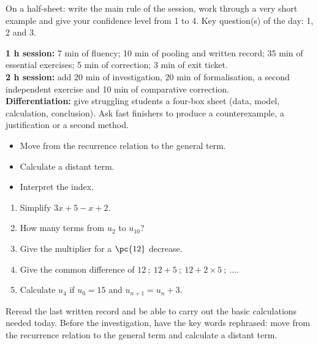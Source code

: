     \begin{exitticket}[3 minutes]On a half-sheet: write the main rule of the session, work through a very short example and give your confidence level from 1 to 4. Key question(s) of the day: 1, 2 and 3.\end{exitticket}

    \ifmxteacher
    \begin{method}
    \textbf{1 h session:} 7 min of fluency; 10 min of pooling and written record; 35 min of essential exercises; 5 min of correction; 3 min of exit ticket.\\
    \textbf{2 h session:} add 20 min of investigation, 20 min of formalisation, a second independent exercise and 10 min of comparative correction.\\
    \textbf{Differentiation:} give struggling students a four-box sheet (data, model, calculation, conclusion). Ask fast finishers to produce a counterexample, a justification or a second method.
    \end{method}
    \fi
{}
\begin{objectives}\begin{itemize}\item Move from the recurrence relation to the general term.\item Calculate a distant term.\item Interpret the index.\end{itemize}\end{objectives}
\begin{fluency}\begin{enumerate}\item Simplify $3x+5-x+2$. \item How many terms from $u_{2}$ to $u_{10}$? \item Give the multiplier for a $\pc{12}$ decrease. \item Give the common difference of $12\ ;\ 12+5\ ;\ 12+2\times5\ ;\ \ldots$. \item Calculate $u_4$ if $u_0=15$ and $u_{n+1}=u_n+3$. \end{enumerate}\end{fluency}
\begin{prerequisites}Reread the last written record and be able to carry out the basic calculations needed today. Before the investigation, have the key words rephrased: move from the recurrence relation to the general term and calculate a distant term.\end{prerequisites}

